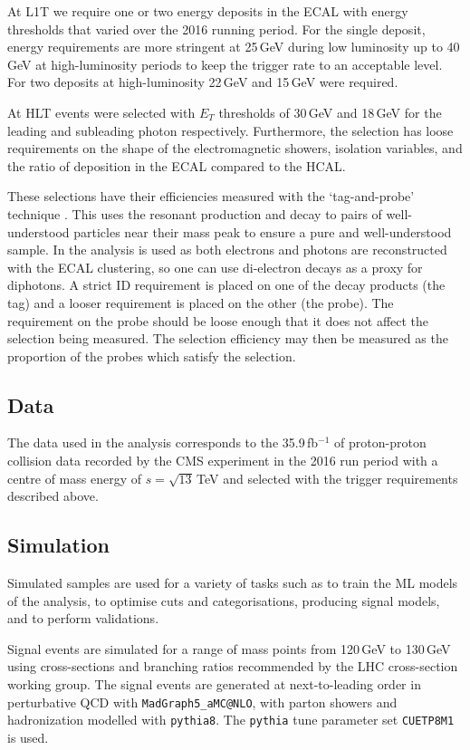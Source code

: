 At L1T we require one or two energy deposits in the ECAL with energy thresholds that varied over the 2016 running period. For the single deposit, energy requirements are more stringent at 25\,GeV during low luminosity up to 40\,GeV at high-luminosity periods to keep the trigger rate to an acceptable level. For two deposits at high-luminosity 22\,GeV and 15\,GeV were required. 

At HLT events were selected with $E_{T}$ thresholds of 30\,GeV and 18\,GeV for the leading and subleading photon respectively. Furthermore, the selection has loose requirements on the shape of the electromagnetic showers, isolation variables, and the ratio of deposition in the ECAL compared to the HCAL. 

These selections have their efficiencies measured with the `tag-and-probe' technique \cite{TagAndProbe}. 
This uses the resonant production and decay to pairs of well-understood particles near their mass peak to ensure a pure and well-understood sample. 
In the \Hgg analysis \Zee is used as both electrons and photons are reconstructed with the ECAL clustering, so one can use di-electron decays as a proxy for diphotons. 
A strict ID requirement is placed on one of the decay products (the tag) and a looser requirement is placed on the other (the probe). 
The requirement on the probe should be loose enough that it does not affect the selection being measured. The selection efficiency may then be measured as the proportion of the probes which satisfy the selection.


\subsection{Data}
The data used in the analysis corresponds to the 35.9\,fb$^{-1}$ of proton-proton collision data recorded by the CMS experiment in the 2016 run period with a centre of mass energy of $s=\sqrt{13}$\,TeV and selected with the trigger requirements described above. 



\subsection{Simulation}

Simulated samples are used for a variety of tasks such as to train the ML models of the analysis, to optimise cuts and categorisations, producing signal models, and to perform validations. 

Signal events are simulated for a range of mass points from 120\,GeV to 130\,GeV using cross-sections and branching ratios recommended by the LHC cross-section working group. 
The signal events are generated at next-to-leading order in perturbative QCD with \texttt{MadGraph5_{}aMC@NLO}, with  parton showers and hadronization modelled with \texttt{pythia8}. The \texttt{pythia} tune parameter set \texttt{CUETP8M1} is used.

